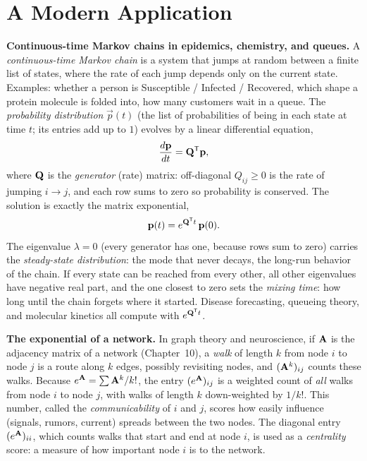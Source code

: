 \section{A Modern Application}
\label{ch25:application}

\begin{applicationbox}
\textbf{Continuous-time Markov chains in epidemics, chemistry, and queues.}
A \emph{continuous-time Markov chain} is a system that jumps at random between a
finite list of states, where the rate of each jump depends only on the current
state. Examples: whether a person is Susceptible / Infected / Recovered, which
shape a protein molecule is folded into, how many customers wait in a queue.
The \emph{probability distribution} $\vec{p}(t)$ (the list of probabilities of
being in each state at time $t$; its entries add up to $1$) evolves by a linear
differential equation,
\[
  \frac{d\mathbf{p}}{dt} = \mathbf{Q}^{\mathsf{T}}\mathbf{p},
\]
where $\mathbf{Q}$ is the \emph{generator} (rate) matrix: off-diagonal $Q_{ij}\ge0$
is the rate of jumping $i\to j$, and each row sums to zero so probability is
conserved. The solution is exactly the matrix exponential,
\[
  \mathbf{p}(t) = e^{\mathbf{Q}^{\mathsf{T}} t}\,\mathbf{p}(0).
\]
The eigenvalue $\lambda=0$ (every generator has one, because rows sum to zero)
carries the \emph{steady-state distribution}: the mode that never decays, the
long-run behavior of the chain. If every state can be reached from every other,
all other eigenvalues have negative real part, and
the one closest to zero sets the \emph{mixing time}: how long until the chain
forgets where it started. Disease forecasting, queueing theory,
and molecular kinetics all compute with $e^{\mathbf{Q}^{\mathsf{T}} t}$.
\end{applicationbox}

\begin{applicationbox}
\textbf{The exponential of a network.} In graph theory and neuroscience, if
$\mathbf{A}$ is the adjacency matrix of a network (Chapter~10), a \emph{walk} of
length $k$ from node $i$ to node $j$ is a route along $k$ edges, possibly
revisiting nodes, and $(\mathbf{A}^k)_{ij}$ counts these walks. Because
$e^{\mathbf{A}}=\sum \mathbf{A}^k/k!$, the entry $(e^{\mathbf{A}})_{ij}$ is a weighted count of
\emph{all} walks from node $i$ to node $j$, with walks of length $k$ down-weighted
by $1/k!$. This number, called the \emph{communicability} of $i$ and $j$,
scores how easily influence (signals, rumors, current) spreads between the two
nodes. The diagonal entry $(e^{\mathbf{A}})_{ii}$, which counts walks that start
and end at node $i$, is used as a \emph{centrality} score: a measure of how
important node $i$ is to the network.
\end{applicationbox}

